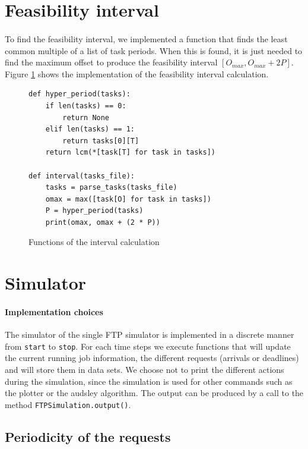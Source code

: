 \documentclass[letterpaper]{article}
\begin{document}
\section{Feasibility interval}

\paragraph{}

To find the feasibility interval, we implemented a function that finds the least common
multiple of a list of task periods. When this is found, it is just needed to find
the maximum offset to produce the feasibility interval $[O_{max}, O_{max} + 2P]$.
Figure \ref{fig:interval} shows the implementation of the
feasibility interval calculation.

\begin{figure}[H]
    \begin{lstlisting}
def hyper_period(tasks):
    if len(tasks) == 0:
        return None
    elif len(tasks) == 1:
        return tasks[0][T]
    return lcm(*[task[T] for task in tasks])

def interval(tasks_file):
    tasks = parse_tasks(tasks_file)
    omax = max([task[O] for task in tasks])
    P = hyper_period(tasks)
    print(omax, omax + (2 * P))
    \end{lstlisting}
    \caption{Functions of the interval calculation}
    \label{fig:interval}
\end{figure}


\section{Simulator}

\paragraph{Implementation choices}

The simulator of the single FTP simulator is implemented in a discrete manner
from \texttt{start} to \texttt{stop}. For each time steps
we execute functions that will update the
current running job information, the different requests (arrivals or deadlines)
and will store them in data sets. We choose not to print the different
actions during the simulation,
since the simulation is used for other commands such as
the plotter or the audsley algorithm. The output can be produced by
a call to the method \texttt{FTPSimulation.output()}.

\subsection{Periodicity of the requests}
\end{document}
